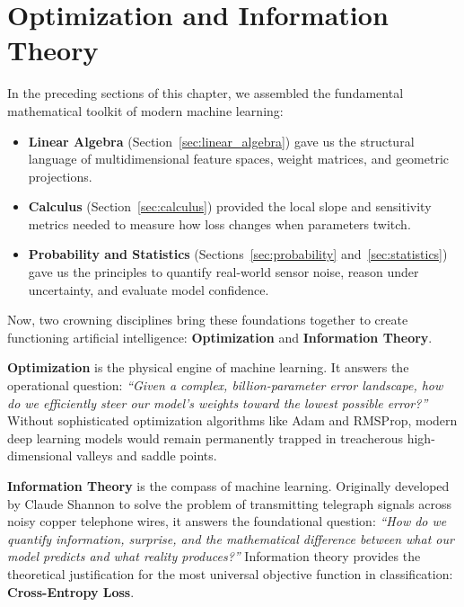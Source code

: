 \section{Optimization and Information Theory}\label{sec:optimization_information}

In the preceding sections of this chapter, we assembled the fundamental mathematical toolkit of modern machine learning:
\begin{itemize}
    \item \textbf{Linear Algebra} (Section~\ref{sec:linear_algebra}) gave us the structural language of multidimensional feature spaces, weight matrices, and geometric projections.
    \item \textbf{Calculus} (Section~\ref{sec:calculus}) provided the local slope and sensitivity metrics needed to measure how loss changes when parameters twitch.
    \item \textbf{Probability and Statistics} (Sections~\ref{sec:probability} and~\ref{sec:statistics}) gave us the principles to quantify real-world sensor noise, reason under uncertainty, and evaluate model confidence.
\end{itemize}

Now, two crowning disciplines bring these foundations together to create functioning artificial intelligence: \textbf{Optimization} and \textbf{Information Theory}.

\textbf{Optimization} is the physical engine of machine learning. It answers the operational question: \textit{``Given a complex, billion-parameter error landscape, how do we efficiently steer our model's weights toward the lowest possible error?''} Without sophisticated optimization algorithms like Adam and RMSProp, modern deep learning models would remain permanently trapped in treacherous high-dimensional valleys and saddle points.

\textbf{Information Theory} is the compass of machine learning. Originally developed by Claude Shannon to solve the problem of transmitting telegraph signals across noisy copper telephone wires, it answers the foundational question: \textit{``How do we quantify information, surprise, and the mathematical difference between what our model predicts and what reality produces?''} Information theory provides the theoretical justification for the most universal objective function in classification: \textbf{Cross-Entropy Loss}.


